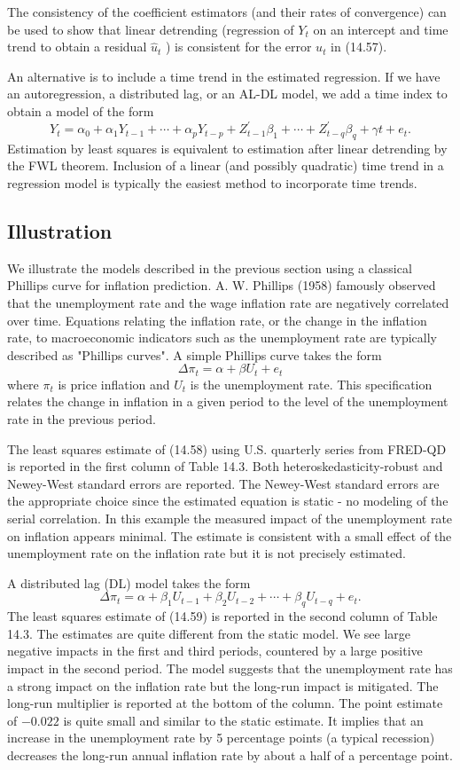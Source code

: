 \documentclass[10pt]{article}
\begin{document}
The consistency of the coefficient estimators (and their rates of convergence) can be used to show that linear detrending (regression of $Y_{t}$ on an intercept and time trend to obtain a residual $\widehat{u}_{t}$ ) is consistent for the error $u_{t}$ in (14.57).

An alternative is to include a time trend in the estimated regression. If we have an autoregression, a distributed lag, or an AL-DL model, we add a time index to obtain a model of the form
$$
Y_{t}=\alpha_{0}+\alpha_{1} Y_{t-1}+\cdots+\alpha_{p} Y_{t-p}+Z_{t-1}^{\prime} \beta_{1}+\cdots+Z_{t-q}^{\prime} \beta_{q}+\gamma t+e_{t} .
$$
Estimation by least squares is equivalent to estimation after linear detrending by the FWL theorem. Inclusion of a linear (and possibly quadratic) time trend in a regression model is typically the easiest method to incorporate time trends.

\subsection{Illustration}
We illustrate the models described in the previous section using a classical Phillips curve for inflation prediction. A. W. Phillips (1958) famously observed that the unemployment rate and the wage inflation rate are negatively correlated over time. Equations relating the inflation rate, or the change in the inflation rate, to macroeconomic indicators such as the unemployment rate are typically described as "Phillips curves". A simple Phillips curve takes the form
$$
\Delta \pi_{t}=\alpha+\beta U_{t}+e_{t}
$$
where $\pi_{t}$ is price inflation and $U_{t}$ is the unemployment rate. This specification relates the change in inflation in a given period to the level of the unemployment rate in the previous period.

The least squares estimate of (14.58) using U.S. quarterly series from FRED-QD is reported in the first column of Table 14.3. Both heteroskedasticity-robust and Newey-West standard errors are reported. The Newey-West standard errors are the appropriate choice since the estimated equation is static - no modeling of the serial correlation. In this example the measured impact of the unemployment rate on inflation appears minimal. The estimate is consistent with a small effect of the unemployment rate on the inflation rate but it is not precisely estimated.

A distributed lag (DL) model takes the form
$$
\Delta \pi_{t}=\alpha+\beta_{1} U_{t-1}+\beta_{2} U_{t-2}+\cdots+\beta_{q} U_{t-q}+e_{t} .
$$
The least squares estimate of (14.59) is reported in the second column of Table 14.3. The estimates are quite different from the static model. We see large negative impacts in the first and third periods, countered by a large positive impact in the second period. The model suggests that the unemployment rate has a strong impact on the inflation rate but the long-run impact is mitigated. The long-run multiplier is reported at the bottom of the column. The point estimate of $-0.022$ is quite small and similar to the static estimate. It implies that an increase in the unemployment rate by 5 percentage points (a typical recession) decreases the long-run annual inflation rate by about a half of a percentage point.
\end{document}
